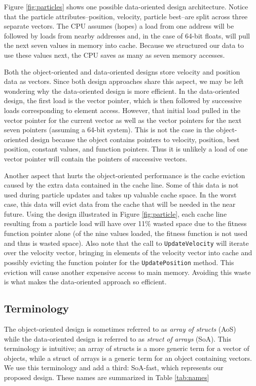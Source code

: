 Figure \ref{fig:particles} shows one possible data-oriented design
architecture. Notice that the particle attributes--position, velocity, particle
best--are split across three separate vectors. The CPU
assumes (hopes) a load from one address will be followed by loads from nearby
addresses and, in the case of 64-bit floats, will pull the next seven values in
memory into cache. Because we structured our data to use these values next, the
CPU saves as many as seven memory accesses.

Both the object-oriented and data-oriented designs store velocity and position
data as vectors. Since both design approaches share this aspect, we may be left
wondering why the data-oriented design is more efficient. In the
data-oriented design, the first load is the vector pointer, which is then
followed by successive loads corresponding to element access. However, that
initial load pulled in the vector pointer for the current vector as well as the
vector pointers for the next seven pointers (assuming a 64-bit system). This is
not the case in the object-oriented design because the object contains pointers
to velocity, position, best position, constant values, and function
pointers. Thus it is unlikely a load of one vector pointer will contain the
pointers of successive vectors.

Another aspect that hurts the object-oriented performance is the cache eviction
caused by the extra data contained in the cache line. Some of this data is not
used during particle updates and takes up valuable cache space. In the worst case,
this data will evict data from the cache that will be needed in the near
future. Using the design illustrated in Figure \ref{fig:particle}, each cache
line resulting from a particle load will have over 11\% wasted space due to the
fitness function pointer alone (of the nine values loaded, the fitness function is
not used and thus is wasted space). Also note that the call to
\texttt{UpdateVelocity} will iterate over the velocity vector, bringing in
elements of the velocity vector into cache and possibly evicting the function
pointer for the \texttt{UpdatePosition} method. This eviction will cause another
expensive access to main memory. Avoiding this waste is what makes the
data-oriented approach so efficient.


\subsection{Terminology}
The object-oriented design is sometimes referred to as \emph{array of structs} (AoS) while
the data-oriented design is referred to as \emph{struct of arrays} (SoA). This
terminology is intuitive; an array of structs is a more generic term for a
vector of objects, while a struct of arrays is a generic term for an object
containing vectors.
We use this terminology and add a third: SoA-fast, which
represents our proposed design. These names are summarized in
Table \ref{tab:names}

